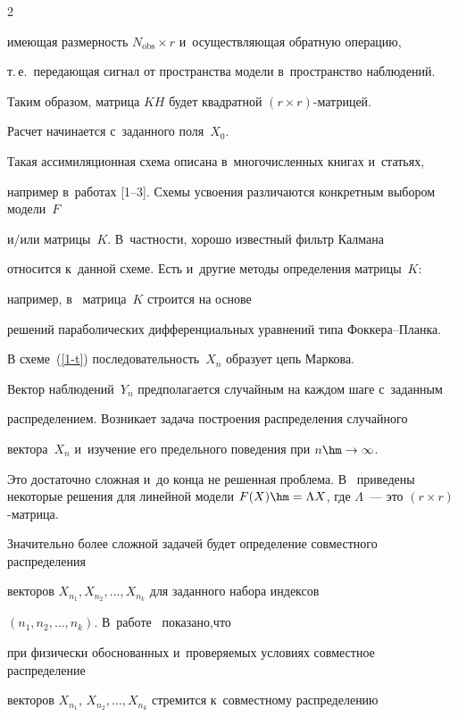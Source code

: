 \begin{multicols}{2}
\begin{itemize}
имеющая размерность $N_{\mathrm{obs}} \times r$ и~осуществляющая обратную операцию,

т.\,е.\ передающая сигнал от пространства модели в~пространство наблюдений.

\end{itemize}



 Таким образом, матрица $KH$ будет квадратной $(r \times r)$-мат\-ри\-цей.

 Расчет начинается с~заданного поля~$X_0$.



Такая ассимиляционная схема описана в~многочисленных книгах и~статьях,

например в~работах [1--3]. Схемы усвоения различаются конкретным выбором модели~$F$

и/или матрицы~$K$. В~частности, хорошо известный фильтр Калмана~\cite{Evensen2}

относится к~данной схеме. Есть и~другие методы определения матрицы~$K$:

например, в~\cite{Belyaev1} матрица~$K$ строится на основе

решений параболических дифференциальных уравнений типа Фок\-ке\-ра--Планка.



В схеме~(\ref{1-t}) последовательность~$X_n$ образует цепь Маркова.

Вектор наблюдений~$Y_n$ предполагается случайным на каждом шаге с~заданным

распределением. Возникает задача построения распределения случайного

вектора~$X_n$ и~изучение его предельного поведения при $n \hm\rightarrow \infty$.

Это достаточно сложная и~до конца не решенная проблема. В~\cite{Belyaev1} приведены некоторые решения для линейной модели $F(X)\hm=\Lambda X$, где $\Lambda$~--- это $(r \times r)$-мат\-рица.



Значительно более сложной задачей будет определение совместного распределения

векторов $X_{n_1}, X_{n_2}, \ldots, X_{n_k}$ для заданного набора индексов

$(n_1, n_2, \ldots , n_k)$. В~работе~\cite{Tanajura} показано,\linebreak что

при физически обоснованных и~про\-ве\-ря\-емых условиях совместное распределение

векторов $X_{n_1}$, $X_{n_2}, \ldots, X_{n_k}$ стремится к~совместному распределению


\end{multicols}
